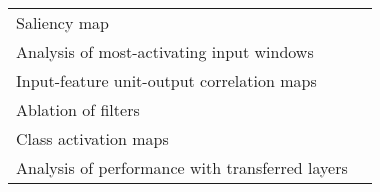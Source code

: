 \begin{tabular}{ll}
Saliency map                                           &                                                                                                                                                                               \cite{Vilamala2017} \\
Analysis of most-activating input windows              &                                                                                                                                                                              \cite{Hartmann2018b} \\
Input-feature unit-output correlation maps             &                                                                                                                                                                          \cite{Schirrmeister2017} \\
Ablation of filters                                    &                                                                                                                                                                                \cite{Lawhern2018} \\
Class activation maps                                  &                                                                                                                                                                                  \cite{Ghosh2018} \\
Analysis of performance with transferred layers        &                                                                                                                                                                            \cite{Hajinoroozi2017} \\
\bottomrule
\end{tabular}
